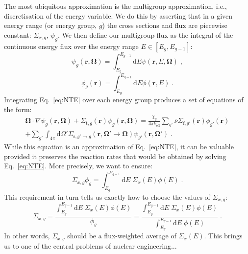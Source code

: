 The most ubiquitous approximation is the multigroup approximation, i.e., discretisation of the energy variable. We do this by asserting that in a given energy range (or energy group, $g$) the cross sections and flux are piecewise constant: $\Sigma_{x,g}$, $\psi_g$. We then define our multigroup flux as the integral of the continuous energy flux over the energy range $E\in [E_{g},E_{g-1}]$:
\begin{equation*}
    \psi_g(\mathbf{r},\mathbf{\Omega}) = \int^{E_{g-1}}_{E_g}\mathrm{d}E \psi(\mathbf{r},E,\mathbf{\Omega})\;\mathrm{,}
\end{equation*}
\begin{equation*}
    \phi_g(\mathbf{r}) = \int^{E_{g-1}}_{E_g}\mathrm{d}E \phi(\mathbf{r},E)\;\mathrm{.}
\end{equation*}
Integrating Eq.~\eqref{eq:NTE} over each energy group produces a set of equations of the form:
\begin{equation}\label{eq:NTE_MG}
\begin{split}
    \mathbf{\Omega}\cdot\nabla\psi_g(\mathbf{r},\mathbf{\Omega}) + \Sigma_{\mathrm{t},g}(\mathbf{r})\psi_g(\mathbf{r},\mathbf{\Omega}) = \frac{\chi_g}{4\pi k_\mathrm{eff}}\sum_{g'} \bar{\nu}\Sigma_{\mathrm{f},g'}(\mathbf{r})\phi_{g'}(\mathbf{r}) \\
    + \sum_{g'}\int_{4\pi}\mathrm{d}\Omega'\Sigma_{\mathrm{s},g'\rightarrow g}(\mathbf{r}, \mathbf{\Omega}'\rightarrow\mathbf{\Omega})\psi_{g'}(\mathbf{r},\mathbf{\Omega}')\;\mathrm{.}
\end{split}
\end{equation}
While this equation is an approximation of Eq.~\eqref{eq:NTE}, it can be valuable provided it preserves the reaction rates that would be obtained by solving Eq.~\eqref{eq:NTE}. More precisely, we want to ensure:
\begin{equation}
    \Sigma_{x,g}\phi_g = \int^{E_{g-1}}_{E_g}\mathrm{d}E\; \Sigma_x(E)\phi(E)\;\mathrm{.}
\end{equation}
This requirement in turn tells us exactly how to choose the values of $\Sigma_{x,g}$:
\begin{equation}\label{eq:MG}
    \Sigma_{x,g}=\frac{\int^{E_{g-1}}_{E_g}\mathrm{d}E\; \Sigma_x(E)\phi(E)}{\phi_g} = \frac{\int^{E_{g-1}}_{E_g}\mathrm{d}E\; \Sigma_x(E)\phi(E)}{\int^{E_{g-1}}_{E_g}\mathrm{d}E\; \phi(E)}\;\mathrm{.}
\end{equation}
In other words, $\Sigma_{x,g}$ should be a flux-weighted average of $\Sigma_x(E)$. This brings us to one of the central problems of nuclear engineering...

